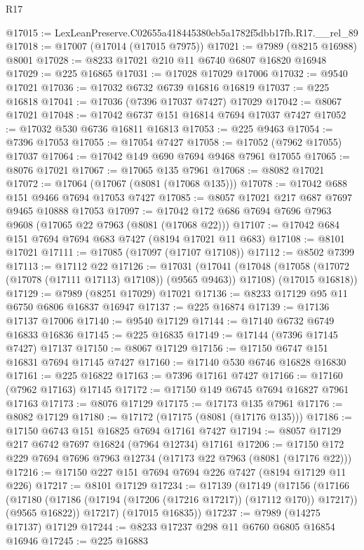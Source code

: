 \begin{lexlean}{R17}
\begin{coremodule}
@17015 := LexLeanPreserve.C02655a418445380eb5a1782f5dbb17fb.R17.__rel_89
@17018 := @17007 (@17014 (@17015 @7975))
@17021 := @7989 (@8215 @16988) @8001
@17028 := @8233 @17021 @210 @11 @6740 @6807 @16820 @16948
@17029 := @225 @16865
@17031 := @17028 @17029 @17006
@17032 := @9540 @17021
@17036 := @17032 @6732 @6739 @16816 @16819
@17037 := @225 @16818
@17041 := @17036 (@7396 @17037 @7427) @17029
@17042 := @8067 @17021
@17048 := @17042 @6737 @151 @16814 @7694 @17037 @7427
@17052 := @17032 @530 @6736 @16811 @16813
@17053 := @225 @9463
@17054 := @7396 @17053
@17055 := @17054 @7427
@17058 := @17052 (@7962 @17055) @17037
@17064 := @17042 @149 @690 @7694 @9468 @7961 @17055
@17065 := @8076 @17021
@17067 := @17065 @135 @7961
@17068 := @8082 @17021
@17072 := @17064 (@17067 (@8081 (@17068 @135)))
@17078 := @17042 @688 @151 @9466 @7694 @17053 @7427
@17085 := @8057 @17021 @217 @687 @7697 @9465 @10888 @17053
@17097 := @17042 @172 @686 @7694 @7696 @7963 @9608 (@17065 @22 @7963 (@8081 (@17068 @22)))
@17107 := @17042 @684 @151 @7694 @7694 @683 @7427 (@8194 @17021 @11 @683)
@17108 := @8101 @17021
@17111 := @17085 (@17097 (@17107 @17108))
@17112 := @8502 @7399
@17113 := @17112 @22
@17126 := @17031
    (@17041
      (@17048 (@17058 (@17072 (@17078 (@17111 @17113) @17108)) (@9565 @9463)) @17108)
      (@17015 @16818))
@17129 := @7989 (@8251 @17029) @17021
@17136 := @8233 @17129 @95 @11 @6750 @6806 @16837 @16947
@17137 := @225 @16874
@17139 := @17136 @17137 @17006
@17140 := @9540 @17129
@17144 := @17140 @6732 @6749 @16833 @16836
@17145 := @225 @16835
@17149 := @17144 (@7396 @17145 @7427) @17137
@17150 := @8067 @17129
@17156 := @17150 @6747 @151 @16831 @7694 @17145 @7427
@17160 := @17140 @530 @6746 @16828 @16830
@17161 := @225 @16822
@17163 := @7396 @17161 @7427
@17166 := @17160 (@7962 @17163) @17145
@17172 := @17150 @149 @6745 @7694 @16827 @7961 @17163
@17173 := @8076 @17129
@17175 := @17173 @135 @7961
@17176 := @8082 @17129
@17180 := @17172 (@17175 (@8081 (@17176 @135)))
@17186 := @17150 @6743 @151 @16825 @7694 @17161 @7427
@17194 := @8057 @17129 @217 @6742 @7697 @16824 (@7964 @12734) @17161
@17206 := @17150 @172 @229 @7694 @7696 @7963 @12734 (@17173 @22 @7963 (@8081 (@17176 @22)))
@17216 := @17150 @227 @151 @7694 @7694 @226 @7427 (@8194 @17129 @11 @226)
@17217 := @8101 @17129
@17234 := @17139
    (@17149
      (@17156
        (@17166
          (@17180 (@17186 (@17194 (@17206 (@17216 @17217)) (@17112 @170)) @17217))
          (@9565 @16822))
        @17217)
      (@17015 @16835))
@17237 := @7989 (@14275 @17137) @17129
@17244 := @8233 @17237 @298 @11 @6760 @6805 @16854 @16946
@17245 := @225 @16883

\end{coremodule}
\end{lexlean}

